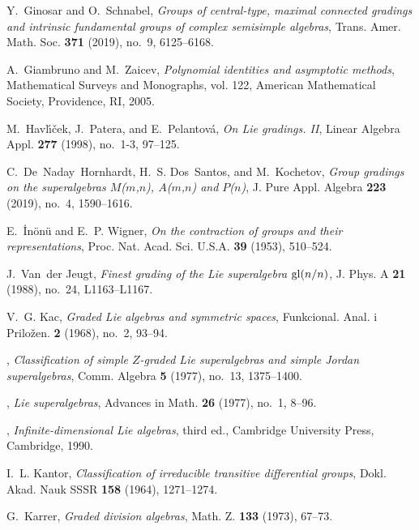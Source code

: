 \documentclass[12pt]{pdfathesis}
\begin{document}
\begin{thebibliography}{BHDSK17}
Y.~Ginosar and O.~Schnabel, \emph{Groups of central-type, maximal connected
  gradings and intrinsic fundamental groups of complex semisimple algebras},
  Trans. Amer. Math. Soc. \textbf{371} (2019), no.~9, 6125--6168. 

A.~Giambruno and M.~Zaicev, \emph{Polynomial identities and asymptotic
  methods}, Mathematical Surveys and Monographs, vol. 122, American
  Mathematical Society, Providence, RI, 2005. 

M.~Havl\'{\i}\v{c}ek, J.~Patera, and E.~Pelantov\'{a}, \emph{On {L}ie gradings.
  {II}}, Linear Algebra Appl. \textbf{277} (1998), no.~1-3, 97--125.

C.~De~Naday~Hornhardt, H.~S. Dos~Santos, and M.~Kochetov, \emph{Group gradings on the
  superalgebras {$M$}({$m$},{$n$}), {$A$}({$m$},{$n$}) and {$P$}({$n$})}, J.
  Pure Appl. Algebra \textbf{223} (2019), no.~4, 1590--1616. 

E.~\.{I}n\"{o}n\"{u} and E.~P. Wigner, \emph{On the contraction of groups and
  their representations}, Proc. Nat. Acad. Sci. U.S.A. \textbf{39} (1953),
  510--524. 

J.~Van~der Jeugt, \emph{Finest grading of the {L}ie superalgebra {${\rm
  gl}(n/n)$}}, J. Phys. A \textbf{21} (1988), no.~24, L1163--L1167. 

V.~G. Kac, \emph{Graded {L}ie algebras and symmetric spaces}, Funkcional. Anal.
  i Prilo\v{z}en. \textbf{2} (1968), no.~2, 93--94. 

\bysame, \emph{Classification of simple {$Z$}-graded {L}ie superalgebras and
  simple {J}ordan superalgebras}, Comm. Algebra \textbf{5} (1977), no.~13,
  1375--1400. 

\bysame, \emph{Lie superalgebras}, Advances in Math. \textbf{26} (1977), no.~1,
  8--96. 

\bysame, \emph{Infinite-dimensional {L}ie algebras}, third ed., Cambridge
  University Press, Cambridge, 1990. 

I.~L. Kantor, \emph{Classification of irreducible transitive differential
  groups}, Dokl. Akad. Nauk SSSR \textbf{158} (1964), 1271--1274. 

G.~Karrer, \emph{Graded division algebras}, Math. Z. \textbf{133} (1973),
  67--73. 


\end{thebibliography}
\end{document}
